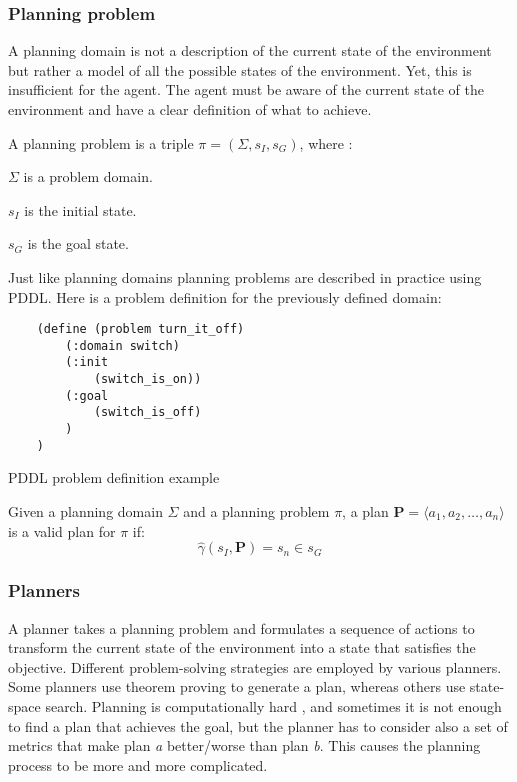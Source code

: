 \subsubsection{Planning problem}
A planning domain is not a description of the current state of the environment 
but rather a model of all the possible states of the environment. 
Yet, this is insufficient for the agent. The agent must be aware 
of the current state of the environment and have a clear definition 
of what to achieve.

\begin{Tdef}
    A planning problem is a triple $\pi = (\Sigma,s_I,s_G)$, where :
    \vspace{-0.5em}
    \begin{compactitem}
        \item 
        $\Sigma$ is a problem domain.
        
        \item 
        $s_I$ is the initial state.
        
        \item 
        $s_G$ is the goal state.
    \end{compactitem}
    \vspace{-0.5em}
\end{Tdef}
\vspace{-0.5em}
Just like planning domains planning problems are described in practice using PDDL. 
Here is a problem definition for the previously defined domain:
\begin{Listing}
    \begin{lstlisting}
    (define (problem turn_it_off)
        (:domain switch)
        (:init
            (switch_is_on))
        (:goal
            (switch_is_off)
        )
    )
  \end{lstlisting}
    \caption{PDDL problem definition example}
    \label{lst:PDDLProblemDefinitonExample}
\end{Listing}

\begin{Tdef}
    Given a planning domain $\Sigma$ and a planning problem $\pi$,
    a plan $\mathbf{P} = \langle a_1,a_2,\dots,a_n\rangle$ is a valid plan for $\pi$ if:
    $$\hat{\gamma}(s_I,\mathbf{P}) = s_n \in s_G$$
\end{Tdef}

\subsubsection{Planners}

A planner takes a planning problem and formulates a sequence of actions 
to transform the current state of the environment into a state 
that satisfies the objective. Different problem-solving 
strategies are employed by various planners. 
Some planners use theorem proving \cite{PlanningSatisfiabilitykautz1992} 
to generate a plan, whereas others use state-space search. 
Planning is computationally hard 
\cite{ComplexityDecidabilityUndecidabilityerol1995}, and 
sometimes it is not enough to find a plan that achieves the goal, 
but the planner has to consider also a set of metrics that make plan 
\textit{a} better/worse than plan \textit{b}. 
This causes the planning process to be more and more complicated.
